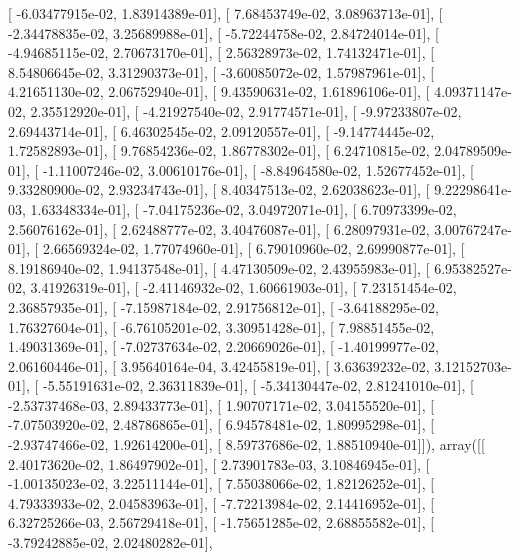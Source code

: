 \documentclass{article}
\begin{document}
       [ -6.03477915e-02,   1.83914389e-01],
       [  7.68453749e-02,   3.08963713e-01],
       [ -2.34478835e-02,   3.25689988e-01],
       [ -5.72244758e-02,   2.84724014e-01],
       [ -4.94685115e-02,   2.70673170e-01],
       [  2.56328973e-02,   1.74132471e-01],
       [  8.54806645e-02,   3.31290373e-01],
       [ -3.60085072e-02,   1.57987961e-01],
       [  4.21651130e-02,   2.06752940e-01],
       [  9.43590631e-02,   1.61896106e-01],
       [  4.09371147e-02,   2.35512920e-01],
       [ -4.21927540e-02,   2.91774571e-01],
       [ -9.97233807e-02,   2.69443714e-01],
       [  6.46302545e-02,   2.09120557e-01],
       [ -9.14774445e-02,   1.72582893e-01],
       [  9.76854236e-02,   1.86778302e-01],
       [  6.24710815e-02,   2.04789509e-01],
       [ -1.11007246e-02,   3.00610176e-01],
       [ -8.84964580e-02,   1.52677452e-01],
       [  9.33280900e-02,   2.93234743e-01],
       [  8.40347513e-02,   2.62038623e-01],
       [  9.22298641e-03,   1.63348334e-01],
       [ -7.04175236e-02,   3.04972071e-01],
       [  6.70973399e-02,   2.56076162e-01],
       [  2.62488777e-02,   3.40476087e-01],
       [  6.28097931e-02,   3.00767247e-01],
       [  2.66569324e-02,   1.77074960e-01],
       [  6.79010960e-02,   2.69990877e-01],
       [  8.19186940e-02,   1.94137548e-01],
       [  4.47130509e-02,   2.43955983e-01],
       [  6.95382527e-02,   3.41926319e-01],
       [ -2.41146932e-02,   1.60661903e-01],
       [  7.23151454e-02,   2.36857935e-01],
       [ -7.15987184e-02,   2.91756812e-01],
       [ -3.64188295e-02,   1.76327604e-01],
       [ -6.76105201e-02,   3.30951428e-01],
       [  7.98851455e-02,   1.49031369e-01],
       [ -7.02737634e-02,   2.20669026e-01],
       [ -1.40199977e-02,   2.06160446e-01],
       [  3.95640164e-04,   3.42455819e-01],
       [  3.63639232e-02,   3.12152703e-01],
       [ -5.55191631e-02,   2.36311839e-01],
       [ -5.34130447e-02,   2.81241010e-01],
       [ -2.53737468e-03,   2.89433773e-01],
       [  1.90707171e-02,   3.04155520e-01],
       [ -7.07503920e-02,   2.48786865e-01],
       [  6.94578481e-02,   1.80995298e-01],
       [ -2.93747466e-02,   1.92614200e-01],
       [  8.59737686e-02,   1.88510940e-01]]), array([[  2.40173620e-02,   1.86497902e-01],
       [  2.73901783e-03,   3.10846945e-01],
       [ -1.00135023e-02,   3.22511144e-01],
       [  7.55038066e-02,   1.82126252e-01],
       [  4.79333933e-02,   2.04583963e-01],
       [ -7.72213984e-02,   2.14416952e-01],
       [  6.32725266e-03,   2.56729418e-01],
       [ -1.75651285e-02,   2.68855582e-01],
       [ -3.79242885e-02,   2.02480282e-01],
\end{document}
